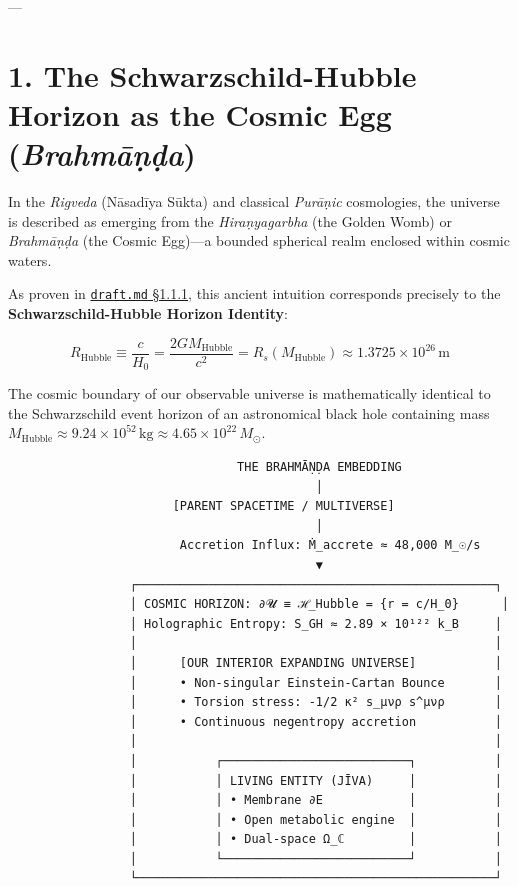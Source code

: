 \documentclass[11pt,a4paper]{article}
\theoremstyle{definition}
\theoremstyle{remark}
\begin{document}
---

\section{1. The Schwarzschild-Hubble Horizon as the Cosmic Egg (\textit{Brahmāṇḍa})}

In the \textit{Rigveda} (Nāsadīya Sūkta) and classical \textit{Purāṇic} cosmologies, the universe is described as emerging from the \textit{Hiraṇyagarbha} (the Golden Womb) or \textit{Brahmāṇḍa} (the Cosmic Egg)—a bounded spherical realm enclosed within cosmic waters.

As proven in \href{../draft.md\#L58-L70}{\texttt{draft.md} \S 1.1.1}, this ancient intuition corresponds precisely to the \textbf{Schwarzschild-Hubble Horizon Identity}:


\begin{equation}
\boxed{R_{\text{Hubble}} \equiv \frac{c}{H_0} = \frac{2 G M_{\text{Hubble}}}{c^2} = R_s(M_{\text{Hubble}}) \approx 1.3725 \times 10^{26} \, \mathrm{m}}
\end{equation}


The cosmic boundary of our observable universe is mathematically identical to the Schwarzschild event horizon of an astronomical black hole containing mass $M_{\text{Hubble}} \approx 9.24 \times 10^{52} \, \mathrm{kg} \approx 4.65 \times 10^{22} \, M_\odot$.

\begin{verbatim}
                                THE BRAHMĀṆḌA EMBEDDING
                                           │
                       [PARENT SPACETIME / MULTIVERSE]
                                           │
                        Accretion Influx: Ṁ_accrete ≈ 48,000 M_☉/s
                                           ▼
                 ┌──────────────────────────────────────────────────┐
                 │ COSMIC HORIZON: ∂𝓤 ≡ ℋ_Hubble = {r = c/H_0}      │
                 │ Holographic Entropy: S_GH ≈ 2.89 × 10¹²² k_B     │
                 │                                                  │
                 │      [OUR INTERIOR EXPANDING UNIVERSE]           │
                 │      • Non-singular Einstein-Cartan Bounce       │
                 │      • Torsion stress: -1/2 κ² s_μνρ s^μνρ       │
                 │      • Continuous negentropy accretion           │
                 │                                                  │
                 │           ┌──────────────────────────┐           │
                 │           │ LIVING ENTITY (JĪVA)     │           │
                 │           │ • Membrane ∂E            │           │
                 │           │ • Open metabolic engine  │           │
                 │           │ • Dual-space Ω_ℂ         │           │
                 │           └──────────────────────────┘           │
                 └──────────────────────────────────────────────────┘
\end{verbatim}
\end{document}
